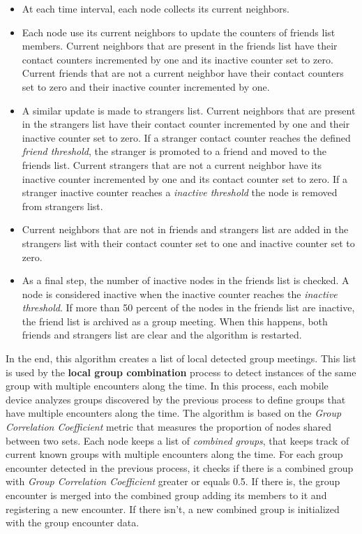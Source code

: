 \begin{itemize}
    \item At each time interval, each node collects its current neighbors.
    \item Each node use its current neighbors to update the counters of friends list members. Current neighbors that are present in the friends list have their contact counters incremented by one and its inactive counter set to zero. Current friends that are not a current neighbor have their contact counters set to zero and their inactive counter incremented by one.
    \item A similar update is made to strangers list. Current neighbors that are present in the strangers list have their contact counter incremented by one and their inactive counter set to zero. If a stranger contact counter reaches the defined \textit{friend threshold}, the stranger is promoted to a friend and moved to the friends list. Current strangers that are not a current neighbor have its inactive counter incremented by one and its contact counter set to zero. If a stranger inactive counter reaches a \textit{inactive threshold} the node is removed from strangers list.
    \item Current neighbors that are not in friends and strangers list are added in the strangers list with their contact counter set to one and inactive counter set to zero.
    \item As a final step, the number of inactive nodes in the friends list is checked. A node is considered inactive when the inactive counter reaches the \textit{inactive threshold}. If more than 50 percent of the nodes in the friends list are inactive, the friend list is archived as a group meeting. When this happens, both friends and strangers list are clear and the algorithm is restarted.
\end{itemize}

In the end, this algorithm creates a list of local detected group meetings. This list is used by the \textbf{local group combination} process to detect instances of the same group with multiple encounters along the time. In this process, each mobile device analyzes groups discovered by the previous process to define groups that have multiple encounters along the time. The algorithm is based on the \textit{Group Correlation Coefficient} metric that measures the proportion of nodes shared between two sets. Each node keeps a list of \textit{combined groups}, that keeps track of current known groups with multiple encounters along the time. For each group encounter detected in the previous process, it checks if there is a combined group with \textit{Group Correlation Coefficient} greater or equals 0.5. If there is, the group encounter is merged into the combined group adding its members to it and registering a new encounter. If there isn't, a new combined group is initialized with the group encounter data.

